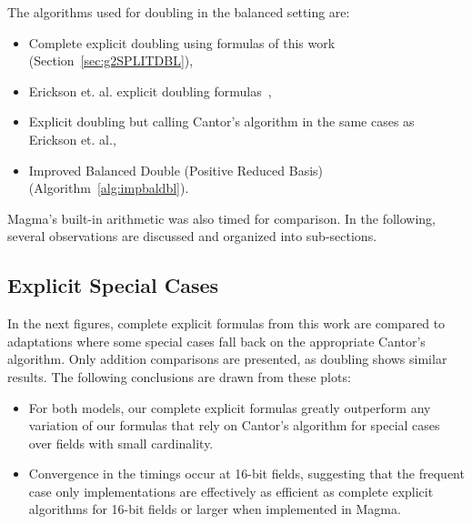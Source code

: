 The algorithms used for doubling in the balanced setting are: 
\begin{itemize}
    \item Complete explicit doubling using formulas of this work (Section~\ref{sec:g2SPLITDBL}),
    \item Erickson et. al. explicit doubling formulas~\cite{EricksonJacobsonStein_realg2_2011},
    \item Explicit doubling but calling Cantor's algorithm in the same cases as Erickson et. al.,
    \item Improved Balanced Double (Positive Reduced Basis) (Algorithm~\ref{alg:impbaldbl}).
\end{itemize} Magma's built-in arithmetic was also timed for comparison.
In the following, several observations are discussed and organized into sub-sections.

\subsection{Explicit Special Cases}

In the next figures, complete explicit formulas from this work are compared to
adaptations where some special cases fall back on the appropriate Cantor's
algorithm. Only addition comparisons are presented, as doubling shows
similar results. The following conclusions are drawn from these plots:
\begin{itemize}
    \item For both models, our complete explicit formulas greatly outperform any
    variation of our formulas that rely on Cantor's algorithm for special cases over fields
    with small cardinality.
     
    \item Convergence in the timings occur at 16-bit fields, suggesting that the
    frequent case only implementations are effectively as efficient as
    complete explicit algorithms for 16-bit fields or larger
    when implemented in Magma.
\end{itemize}

